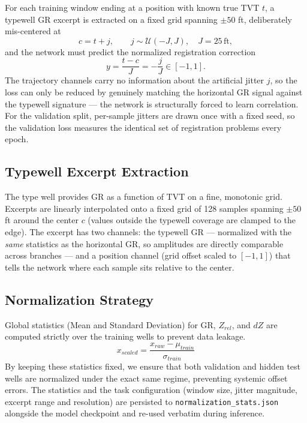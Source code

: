 \documentclass[12pt, a4paper]{article}
\begin{document}
    For each training window ending at a position with known true TVT $t$, a typewell GR excerpt is extracted on a fixed grid spanning $\pm 50$ ft, deliberately mis-centered at
    \begin{equation}
        c = t + j, \qquad j \sim \mathcal{U}(-J, J), \quad J = 25\,\text{ft},
    \end{equation}
    and the network must predict the normalized registration correction
    \begin{equation}
        y = \frac{t - c}{J} = -\frac{j}{J} \in [-1, 1].
    \end{equation}
    The trajectory channels carry no information about the artificial jitter $j$, so the loss can only be reduced by genuinely matching the horizontal GR signal against the typewell signature --- the network is structurally forced to learn correlation. For the validation split, per-sample jitters are drawn once with a fixed seed, so the validation loss measures the identical set of registration problems every epoch.

    \subsection{Typewell Excerpt Extraction}
    The type well provides GR as a function of TVT on a fine, monotonic grid. Excerpts are linearly interpolated onto a fixed grid of 128 samples spanning $\pm 50$ ft around the center $c$ (values outside the typewell coverage are clamped to the edge). The excerpt has two channels: the typewell GR --- normalized with the \textit{same} statistics as the horizontal GR, so amplitudes are directly comparable across branches --- and a position channel (grid offset scaled to $[-1, 1]$) that tells the network where each sample sits relative to the center.

    \subsection{Normalization Strategy}
    Global statistics (Mean and Standard Deviation) for GR, $Z_{rel}$, and $dZ$ are computed strictly over the training wells to prevent data leakage.
    \begin{equation}
        x_{scaled} = \frac{x_{raw} - \mu_{train}}{\sigma_{train}}
    \end{equation}
    By keeping these statistics fixed, we ensure that both validation and hidden test wells are normalized under the exact same regime, preventing systemic offset errors. The statistics and the task configuration (window size, jitter magnitude, excerpt range and resolution) are persisted to \texttt{normalization\_stats.json} alongside the model checkpoint and re-used verbatim during inference.
\end{document}
